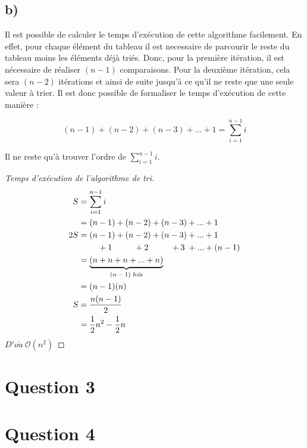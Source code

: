 \documentclass[12pt]{article}
\begin{document}
  \subsection*{b)}

    Il est possible de calculer le temps d'exécution de cette algorithme
    facilement. En effet, pour chaque élément du tableau il est necessaire de
    parcourir le reste du tableau moins les éléments déjà triés. Donc, pour la
    première itération, il est nécessaire de réaliser \( (n - 1) \)
    comparaisons. Pour la deuxième itération, cela sera \( (n - 2) \) itérations
    et ainsi de suite jusqu'à ce qu'il ne reste que une seule valeur à trier. Il
    est donc possible de formaliser le temps d'exécution de cette manière :

    \[ (n - 1) + (n - 2) + (n - 3) + ... + 1 = \sum _ {i=1} ^ {n - 1} i \]

    \noindent Il ne reste qu'à trouver l'ordre de
    \( \sum _ {i=1} ^ {n - 1} i \). \newpage

    \begin{proof}[Temps d'exécution de l'algorithme de tri]
      \begin{align*}
        S   &= \sum _ {i=1} ^ {n - 1} i \\
            &= (n - 1) + (n - 2) + (n - 3) + ... + 1 \\
        2S  &= (n - 1) + (n - 2) + (n - 3) + ... + 1 \\
            &\qquad\,\, + 1 \qquad\;\:\, + 2 \qquad\;\:\, + 3 \;+ ... + (n - 1) \\
            &= \underbrace{(n + n + n + ... + n)}_\textrm{\( (n - 1) \) fois} \\
            &= (n - 1)(n) \\
        S   &= \frac{n(n - 1)}{2} \\
            &= \frac{1}{2}n^2 - \frac{1}{2}n
      \end{align*}
      \( D'o\grave{u} \ \mathcal{O}(n^2) \)
    \end{proof}

  \newpage

  \section*{Question 3}

  \newpage

  \section*{Question 4}
\end{document}
